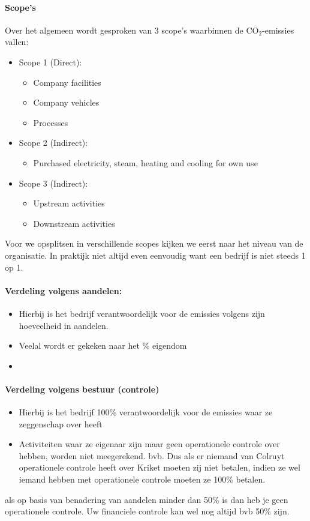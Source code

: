 \documentclass[12pt]{article}
\begin{document}
\paragraph{Scope's}
Over het algemeen wordt gesproken van 3 scope's waarbinnen de CO$_2$-emissies vallen:\begin{itemize}
    \item Scope 1 (Direct):\begin{itemize}
        \item Company facilities
        \item Company vehicles 
        \item Processes
    \end{itemize}
    \item Scope 2 (Indirect):\begin{itemize}
        \item Purchased electricity, steam, heating and cooling for own use
    \end{itemize}
    \item Scope 3 (Indirect):\begin{itemize}
        \item Upstream activities 
        \item Downstream activities
    \end{itemize}
\end{itemize}
Voor we opsplitsen in verschillende scopes kijken we eerst naar het niveau van de organisatie. In praktijk niet altijd even eenvoudig want een bedrijf is niet steeds 1 op 1.
\paragraph{Verdeling volgens aandelen:}
\begin{itemize}
    \item Hierbij is het bedrijf verantwoordelijk voor de emissies volgens zijn hoeveelheid in aandelen.
    \item Veelal wordt er gekeken naar het \% eigendom
    \item 
\end{itemize}
\paragraph{Verdeling volgens bestuur (controle)}
\begin{itemize}
    \item Hierbij is het bedrijf 100\% verantwoordelijk voor de emissies waar ze zeggenschap over heeft
    \item Activiteiten waar ze eigenaar zijn maar geen operationele controle over hebben, worden niet meegerekend. bvb. Dus als er niemand van Colruyt operationele controle heeft over Kriket moeten zij niet betalen, indien ze wel iemand hebben met operationele controle moeten ze 100\% betalen.
\end{itemize}
als op basis van benadering van aandelen minder dan 50\% is dan heb je geen operationele controle. Uw financiele controle kan wel nog altijd bvb 50\% zijn.
\end{document}
